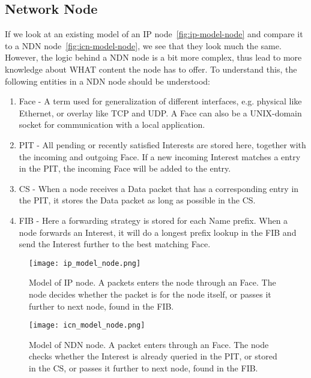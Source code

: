 \subsection{Network Node}
If we look at an existing model of an \gls{IP} node~\autoref{fig:ip-model-node} and compare it to a \gls{NDN} node~\autoref{fig:icn-model-node}, we see that they look much the same.
However, the logic behind a \gls{NDN} node is a bit more complex, thus lead to more knowledge about WHAT content the node has to offer.
To understand this, the following entities in a \gls{NDN} node should be understood:
\begin{enumerate}
  \item Face - A term used for generalization of different interfaces, e.g. physical like Ethernet, or overlay like \gls{TCP} and \gls{UDP}. A Face can also be a UNIX-domain socket for communication with a local application.
  \item \gls{PIT} - All pending or recently satisfied Interests are stored here, together with the incoming and outgoing Face.
  If a new incoming Interest matches a entry in the \gls{PIT}, the incoming Face will be added to the entry. 
  \item \gls{CS} - When a node receives a Data packet that has a corresponding entry in the \gls{PIT}, it stores the Data packet as long as possible in the \gls{CS}. 
  \item \gls{FIB} - Here a forwarding strategy is stored for each Name prefix. 
  When a node forwards an Interest, it will do a longest prefix lookup in the \gls{FIB} and send the Interest further to the best matching Face.
\end{enumerate}

\begin{figure}[H]
  \centering
  \texttt{[image: ip\_model\_node.png]}
  \caption{Model of IP node. A packets enters the node through an Face. 
  The node decides whether the packet is for the node itself, or passes it further to next node, found in the FIB.}
  \label{fig:ip-model-node}
\end{figure}

\begin{figure}[H]
  \centering
  \texttt{[image: icn\_model\_node.png]}
  \caption{Model of NDN node. A packet enters through an Face. 
  The node checks whether the Interest is already queried in the PIT, or stored in the CS, or passes it further to next node, found in the FIB.}
  \label{fig:icn-model-node}
\end{figure}

